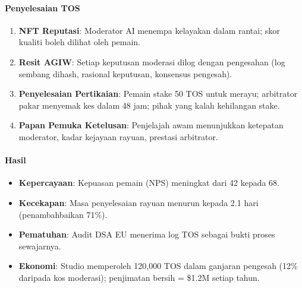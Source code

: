 \documentclass[11pt]{article}
\begin{document}
\paragraph{Penyelesaian TOS}
\begin{enumerate}[noitemsep]
  \item \textbf{NFT Reputasi}: Moderator AI menempa kelayakan dalam rantai; skor kualiti boleh dilihat oleh pemain.
  \item \textbf{Resit AGIW}: Setiap keputusan moderasi dilog dengan pengesahan (log sembang dihash, rasional keputusan, konsensus pengesah).
  \item \textbf{Penyelesaian Pertikaian}: Pemain stake 50 TOS untuk merayu; arbitrator pakar menyemak kes dalam 48 jam; pihak yang kalah kehilangan stake.
  \item \textbf{Papan Pemuka Ketelusan}: Penjelajah awam menunjukkan ketepatan moderator, kadar kejayaan rayuan, prestasi arbitrator.
\end{enumerate}

\paragraph{Hasil}
\begin{itemize}[noitemsep]
  \item \textbf{Kepercayaan}: Kepuasan pemain (NPS) meningkat dari 42 kepada 68.
  \item \textbf{Kecekapan}: Masa penyelesaian rayuan menurun kepada 2.1 hari (penambahbaikan 71\%).
  \item \textbf{Pematuhan}: Audit DSA EU menerima log TOS sebagai bukti proses sewajarnya.
  \item \textbf{Ekonomi}: Studio memperoleh 120,000 TOS dalam ganjaran pengesah (12\% daripada kos moderasi); penjimatan bersih = \$1.2M setiap tahun.
\end{itemize}
\end{document}
